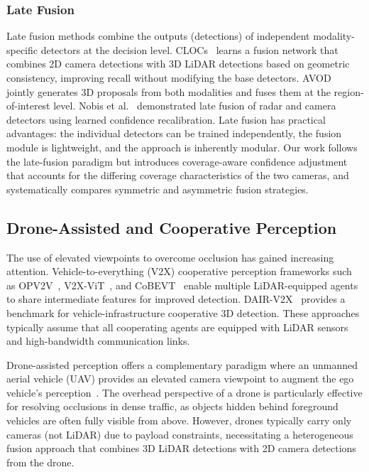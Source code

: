 \documentclass[sustainability,article,submit,moreauthors,pdftex]{Definitions/mdpi}
\begin{document}
\subsubsection{Late Fusion}

Late fusion methods combine the outputs (detections) of independent modality-specific detectors at the decision level. CLOCs~\cite{pang2020clocs} learns a fusion network that combines 2D camera detections with 3D LiDAR detections based on geometric consistency, improving recall without modifying the base detectors. AVOD~\cite{ku2018avod} jointly generates 3D proposals from both modalities and fuses them at the region-of-interest level. Nobis et al.~\cite{nobis2021late} demonstrated late fusion of radar and camera detectors using learned confidence recalibration. Late fusion has practical advantages: the individual detectors can be trained independently, the fusion module is lightweight, and the approach is inherently modular. Our work follows the late-fusion paradigm but introduces coverage-aware confidence adjustment that accounts for the differing coverage characteristics of the two cameras, and systematically compares symmetric and asymmetric fusion strategies.

\subsection{Drone-Assisted and Cooperative Perception}

The use of elevated viewpoints to overcome occlusion has gained increasing attention. Vehicle-to-everything (V2X) cooperative perception frameworks such as OPV2V~\cite{xu2022opv2v}, V2X-ViT~\cite{xu2022v2xvit}, and CoBEVT~\cite{xu2023cobevt} enable multiple LiDAR-equipped agents to share intermediate features for improved detection. DAIR-V2X~\cite{yu2022dairv2x} provides a benchmark for vehicle-infrastructure cooperative 3D detection. These approaches typically assume that all cooperating agents are equipped with LiDAR sensors and high-bandwidth communication links.

Drone-assisted perception offers a complementary paradigm where an unmanned aerial vehicle (UAV) provides an elevated camera viewpoint to augment the ego vehicle's perception~\cite{liu2022drone,shi2024dronecoop}. The overhead perspective of a drone is particularly effective for resolving occlusions in dense traffic, as objects hidden behind foreground vehicles are often fully visible from above. However, drones typically carry only cameras (not LiDAR) due to payload constraints, necessitating a heterogeneous fusion approach that combines 3D LiDAR detections with 2D camera detections from the drone.
\end{document}
